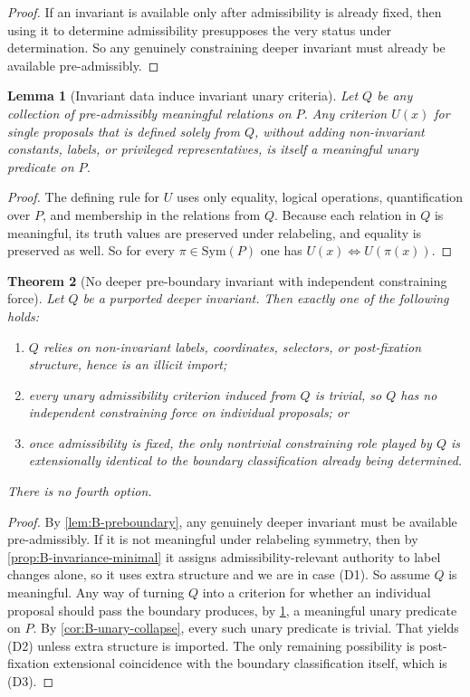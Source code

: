\documentclass[11pt]{article}
\theoremstyle{plain}
\newtheorem{theorem}{Theorem}[section]
\newtheorem{lemma}[theorem]{Lemma}
\theoremstyle{definition}
\begin{document}
\begin{proof}
If an invariant is available only after admissibility is already fixed, then using it to determine admissibility presupposes the very status under determination. So any genuinely constraining deeper invariant must already be available pre-admissibly.
\end{proof}

\begin{lemma}[Invariant data induce invariant unary criteria]
\label{lem:B-unary-criteria}
Let $Q$ be any collection of pre-admissibly meaningful relations on $P$. Any criterion $U(x)$ for single proposals that is defined solely from $Q$, without adding non-invariant constants, labels, or privileged representatives, is itself a meaningful unary predicate on $P$.
\end{lemma}

\begin{proof}
The defining rule for $U$ uses only equality, logical operations, quantification over $P$, and membership in the relations from $Q$. Because each relation in $Q$ is meaningful, its truth values are preserved under relabeling, and equality is preserved as well. So for every $\pi\in\mathrm{Sym}(P)$ one has $U(x)\Leftrightarrow U(\pi(x))$.
\end{proof}

\begin{theorem}[No deeper pre-boundary invariant with independent constraining force]
\label{thm:B-no-deeper-invariant}
Let $Q$ be a purported deeper invariant. Then exactly one of the following holds:
\begin{enumerate}[label=(D\arabic*), leftmargin=2.8em]
    \item $Q$ relies on non-invariant labels, coordinates, selectors, or post-fixation structure, hence is an illicit import;
    \item every unary admissibility criterion induced from $Q$ is trivial, so $Q$ has no independent constraining force on individual proposals; or
    \item once admissibility is fixed, the only nontrivial constraining role played by $Q$ is extensionally identical to the boundary classification already being determined.
\end{enumerate}
There is no fourth option.
\end{theorem}

\begin{proof}
By \cref{lem:B-preboundary}, any genuinely deeper invariant must be available pre-admissibly. If it is not meaningful under relabeling symmetry, then by \cref{prop:B-invariance-minimal} it assigns admissibility-relevant authority to label changes alone, so it uses extra structure and we are in case (D1). So assume $Q$ is meaningful. Any way of turning $Q$ into a criterion for whether an individual proposal should pass the boundary produces, by \cref{lem:B-unary-criteria}, a meaningful unary predicate on $P$. By \cref{cor:B-unary-collapse}, every such unary predicate is trivial. That yields (D2) unless extra structure is imported. The only remaining possibility is post-fixation extensional coincidence with the boundary classification itself, which is (D3).
\end{proof}
\end{document}
